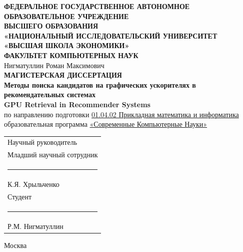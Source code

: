 \documentclass[14pt,a4paper]{extreport}
\numberwithin{figure}{chapter}
\numberwithin{table}{chapter}
\numberwithin{equation}{chapter}
\begin{document}

\begin{titlepage}
    \thispagestyle{empty}
    \small

    \begin{center}
        \textbf{ФЕДЕРАЛЬНОЕ ГОСУДАРСТВЕННОЕ АВТОНОМНОЕ ОБРАЗОВАТЕЛЬНОЕ УЧРЕЖДЕНИЕ}\\
        \textbf{ВЫСШЕГО ОБРАЗОВАНИЯ}\\
        \textbf{«НАЦИОНАЛЬНЫЙ ИССЛЕДОВАТЕЛЬСКИЙ УНИВЕРСИТЕТ}\\
        \textbf{«ВЫСШАЯ ШКОЛА ЭКОНОМИКИ»}\\[0.3cm]

        \textbf{ФАКУЛЬТЕТ КОМПЬЮТЕРНЫХ НАУК}\\[1.4cm]

        Нигматуллин Роман Максимович \\[1.0cm]

        \textbf{МАГИСТЕРСКАЯ ДИССЕРТАЦИЯ}\\[0.6cm]

        \textbf{Методы поиска кандидатов на графических ускорителях в рекомендательных системах}\\[0.25cm]
        \textbf{GPU Retrieval in Recommender Systems}\\[1.0cm]

        по направлению подготовки \underline{01.04.02 Прикладная математика и информатика}\\
        образовательная программа \underline{«Современные Компьютерные Науки»}
    \end{center}

    \vspace{0.9cm}

    \begin{flushright}
        \begin{tabular}{l}
            Научный руководитель\\
            Младший научный сотрудник\\
            [0.35cm]
            \rule{7cm}{0.4pt}\\
            К.Я. Хрыльченко \\[1cm]

            Студент\\
            [0.35cm]
            \rule{7cm}{0.4pt}\\
            Р.М. Нигматуллин
        \end{tabular}
    \end{flushright}

    \vfill

    \begin{center}
        Москва \the\year
    \end{center}
\end{titlepage}
\end{document}
